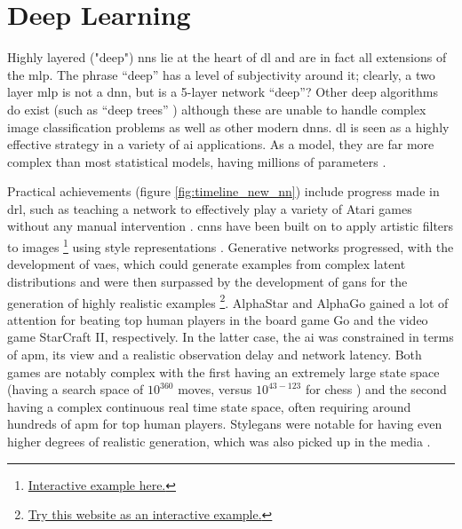 \section{Deep Learning}


Highly layered ("deep") \gls{nn}s lie at the heart of \gls{dl} and are in fact all extensions of the \gls{mlp}. The phrase \enquote{deep} has a level of subjectivity around it; clearly, a two \gls{layer} \gls{mlp} is not a \gls{dnn}, but is a 5-layer network \enquote{deep}? Other deep algorithms do exist (such as \enquote{deep trees} \cite{deep_forest}) although these are unable to handle complex image classification problems as well as other modern {dnn}s. \gls{dl} is seen as a highly effective strategy in a variety of \gls{ai} applications. As a model, they are far more complex than most statistical models, having millions of parameters \cite{unreasonable_dl}.  
\bigskip

Practical achievements (figure \ref{fig:timeline_new_nn}) include progress made in \gls{drl}, such as teaching a network to effectively play a variety of Atari games without any manual intervention \cite{drl_atari}. \gls{cnn}s have been built on to apply artistic filters to images \footnote{\href{https://deepart.io/}{Interactive example here.}} using style representations \cite{neural_style}. Generative networks progressed, with the development of \gls{vae}s, which could generate examples from complex latent distributions and were then surpassed by the development of \gls{gan}s for the generation of highly realistic examples \cite{gans}\footnote{\href{http://www.whichfaceisreal.com/index.php}{Try this website as an interactive example.}}. AlphaStar \cite{alphastar} and AlphaGo \cite{alphago} gained a lot of attention \cite{press_alpha_go} \cite{press_alpha_star} for beating top human players in the board game Go and the video game StarCraft II, respectively. In the latter case, the \gls{ai} was constrained in terms of \gls{apm}, its view and a realistic observation delay and network latency. Both games are notably complex with the first having an extremely large state space (having a search space of $10^360$ moves, versus $10^{43-123}$ for chess \cite{moves_chess_go}) and the second having a complex continuous real time state space, often requiring  around hundreds of \gls{apm} for top human players. Style\gls{gan}s were notable for having even higher degrees of realistic generation, which was also picked up in the media \cite{press_stylegan}.
\bigskip

